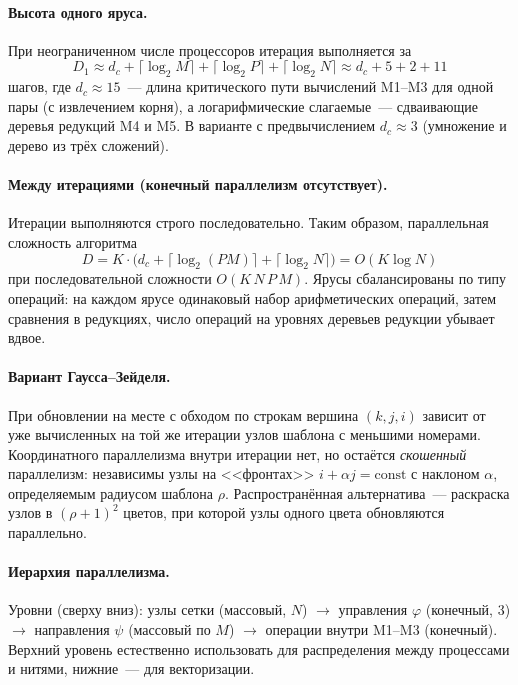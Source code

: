 \documentclass[14pt,a4paper]{extarticle}
\begin{document}
\paragraph{Высота одного яруса.}
При неограниченном числе процессоров итерация выполняется за
\[
	D_1 \approx d_c + \lceil\log_2 M\rceil + \lceil\log_2 P\rceil + \lceil\log_2 N\rceil
	\approx d_c + 5 + 2 + 11
\]
шагов, где $d_c\approx 15$~--- длина критического пути вычислений M1--M3
для одной пары (с извлечением корня), а логарифмические слагаемые~---
сдваивающие деревья редукций M4 и M5. В варианте с предвычислением
$d_c\approx 3$ (умножение и дерево из трёх сложений).

\paragraph{Между итерациями (конечный параллелизм отсутствует).}
Итерации выполняются строго последовательно. Таким образом,
параллельная сложность алгоритма
\[
	D = K\cdot\bigl(d_c + \lceil\log_2 (P M)\rceil + \lceil\log_2 N\rceil\bigr)
	= O(K\log N)
\]
при последовательной сложности $O(K\,N\,P\,M)$. Ярусы сбалансированы
по типу операций: на каждом ярусе одинаковый набор
арифметических операций, затем сравнения в редукциях, число операций
на уровнях деревьев редукции убывает вдвое.

\paragraph{Вариант Гаусса--Зейделя.}
При обновлении на месте с обходом по строкам вершина $(k,j,i)$ зависит
от уже вычисленных на той же итерации узлов шаблона с меньшими
номерами. Координатного параллелизма внутри итерации нет, но остаётся
\emph{скошенный} параллелизм: независимы узлы на <<фронтах>>
$i+\alpha j=\mathrm{const}$ с наклоном $\alpha$, определяемым радиусом
шаблона $\rho$. Распространённая альтернатива~--- раскраска узлов в
$(\rho+1)^2$ цветов, при которой узлы одного цвета обновляются
параллельно.

\paragraph{Иерархия параллелизма.}
Уровни (сверху вниз): узлы сетки (массовый, $N$) $\to$ управления
$\varphi$ (конечный, 3) $\to$ направления $\psi$ (массовый по $M$) $\to$
операции внутри M1--M3 (конечный). Верхний уровень естественно
использовать для распределения между процессами и нитями, нижние~--- для
векторизации.
\end{document}
